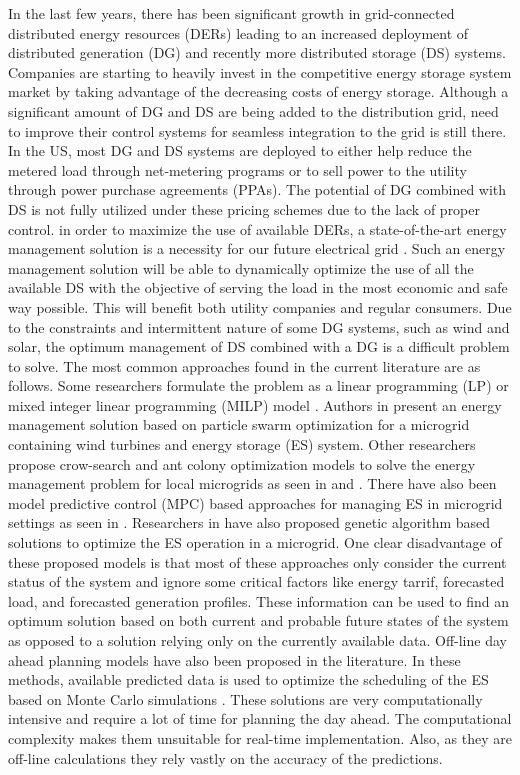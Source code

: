 In the last few years, there has been significant growth in grid-connected distributed energy resources (DERs) leading to an increased deployment of distributed generation (DG) and recently more distributed storage (DS) systems. Companies are starting to heavily invest in the competitive energy storage system market by taking advantage of the decreasing costs of energy storage. Although a significant amount of DG and DS are being added to the distribution grid, need to improve their control systems for seamless integration to the grid is still there. In the US, most DG and DS systems are deployed to either help reduce the metered load through net-metering programs or to sell power to the utility through power purchase agreements (PPAs). The potential of DG combined with DS is not fully utilized under these pricing schemes due to the lack of proper control. in order to maximize the use of available DERs, a state-of-the-art energy management solution is a necessity for our future electrical grid . Such an energy management solution will be able to dynamically optimize the use of all the available DS with the objective of serving the load in the most economic and safe way possible. This will benefit both utility companies and regular consumers. Due to the constraints and intermittent nature of some DG systems, such as wind and solar, the optimum management of DS combined with a DG is a difficult problem to solve. The most common approaches found in the current literature are as follows. Some researchers formulate the problem as a linear programming (LP) or mixed integer linear programming (MILP) model \cite{lp73, lp74, lp75}. Authors in \cite{pso80, pso81} present an energy management solution based on particle swarm optimization for a microgrid containing wind turbines and energy storage (ES) system. Other researchers propose crow-search and ant colony optimization models to solve the energy management problem for local microgrids as seen in \cite{csa87} and \cite{aco84}. There have also been model predictive control (MPC) based approaches for managing ES in microgrid settings as seen in \cite{energymanajaboulay,mpcmorstyn}.  Researchers in \cite{ga76, ga77} have also proposed genetic algorithm based solutions to optimize the ES operation in a microgrid. One clear disadvantage of these proposed models is that most of these approaches only consider the current status of the system and ignore some critical factors like energy tarrif, forecasted load, and forecasted generation profiles.  These information can be used to find an optimum solution based on both current and probable future states of the system as opposed to a solution relying only on the currently available data. Off-line day ahead planning models have also been proposed in the literature. In these methods, available predicted data is used to optimize the scheduling of the ES based on Monte Carlo simulations \cite{6872821,7010943,6839110}. These solutions are very computationally intensive and require a lot of time for planning the day ahead. The computational complexity makes them unsuitable for real-time implementation. Also, as they are off-line calculations they rely vastly on the accuracy of the predictions.

